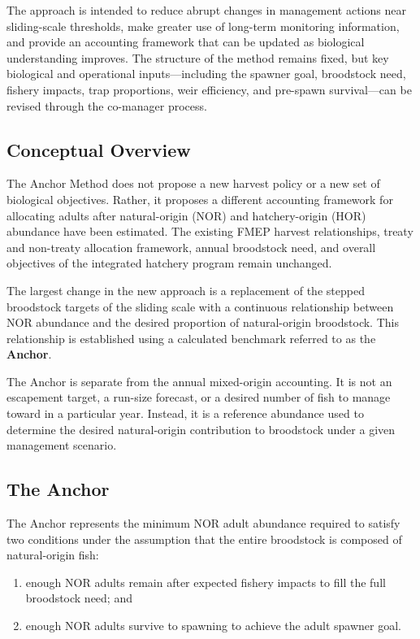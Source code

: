 \documentclass[12pt,letterpaper]{article}
\providecommand{\tightlist}{%
  \setlength{\itemsep}{0pt}\setlength{\parskip}{0pt}}
\begin{document}
The approach is intended to reduce abrupt changes in management actions near sliding-scale thresholds, make greater use of long-term monitoring information, and provide an accounting framework that can be updated as biological understanding improves. The structure of the method remains fixed, but key biological and operational inputs---including the spawner goal, broodstock need, fishery impacts, trap proportions, weir efficiency, and pre-spawn survival---can be revised through the co-manager process.

\subsection{Conceptual Overview}\label{conceptual-overview}

The Anchor Method does not propose a new harvest policy or a new set of biological objectives. Rather, it proposes a different accounting framework for allocating adults after natural-origin (NOR) and hatchery-origin (HOR) abundance have been estimated. The existing FMEP harvest relationships, treaty and non-treaty allocation framework, annual broodstock need, and overall objectives of the integrated hatchery program remain unchanged.

The largest change in the new approach is a replacement of the stepped broodstock targets of the sliding scale with a continuous relationship between NOR abundance and the desired proportion of natural-origin broodstock. This relationship is established using a calculated benchmark referred to as the \textbf{Anchor}.

The Anchor is separate from the annual mixed-origin accounting. It is not an escapement target, a run-size forecast, or a desired number of fish to manage toward in a particular year. Instead, it is a reference abundance used to determine the desired natural-origin contribution to broodstock under a given management scenario.

\subsection{The Anchor}\label{the-anchor}

The Anchor represents the minimum NOR adult abundance required to satisfy two conditions under the assumption that the entire broodstock is composed of natural-origin fish:

\begin{enumerate}
\def\labelenumi{\arabic{enumi}.}
\tightlist
\item
  enough NOR adults remain after expected fishery impacts to fill the full broodstock need; and
\item
  enough NOR adults survive to spawning to achieve the adult spawner goal.
\end{enumerate}
\end{document}
